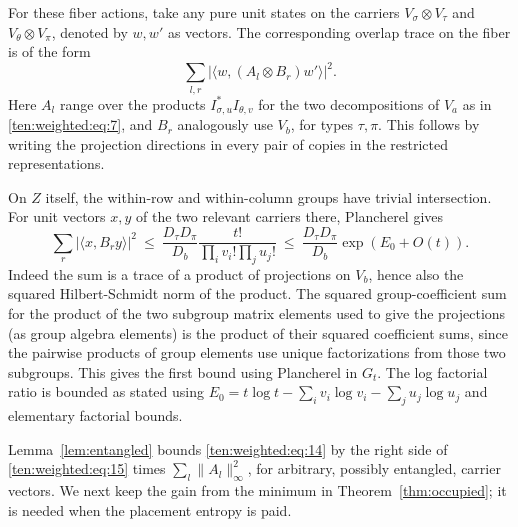 For these fiber actions, take any pure unit states on the carriers \(V_\sigma\otimes V_\tau\) and \(V_\theta\otimes V_\pi\), denoted by \(w,w'\) as vectors. The corresponding overlap trace on the fiber is of the form
\begin{equation}
 \sum_{l,r} |\langle w,(A_l\otimes B_r) w'\rangle|^2.                                      \label{ten:weighted:eq:14}
\end{equation}
Here \(A_l\) range over the products \(I_{\sigma,u}^* I_{\theta,v}\) for the two decompositions of \(V_a\) as in \eqref{ten:weighted:eq:7}, and \(B_r\) analogously use \(V_b\), for types \(\tau,\pi\). This follows by writing the projection directions in every pair of copies in the restricted representations.

On \(Z\) itself, the within-row and within-column groups have trivial intersection. For unit vectors \(x,y\) of the two relevant carriers there, Plancherel gives
\begin{equation}
 \sum_r |\langle x,B_r y\rangle|^2
 \ \le\ \frac{D_\tau D_\pi}{D_b}\frac{t!}{\prod_i v_i!\prod_j u_j!}
 \ \le\ \frac{D_\tau D_\pi}{D_b}\exp(E_0+O(t)).                                             \label{ten:weighted:eq:15}
\end{equation}
Indeed the sum is a trace of a product of projections on \(V_b\), hence also the squared Hilbert-Schmidt norm of the product. The squared group-coefficient sum for the product of the two subgroup matrix elements used to give the projections (as group algebra elements) is the product of their squared coefficient sums, since the pairwise products of group elements use unique factorizations from those two subgroups. This gives the first bound using Plancherel in \(G_t\). The log factorial ratio is bounded as stated using \(E_0=t\log t-\sum_i v_i\log v_i-\sum_j u_j\log u_j\) and elementary factorial bounds.

Lemma~\ref{lem:entangled} bounds \eqref{ten:weighted:eq:14} by the right side of \eqref{ten:weighted:eq:15} times \(\sum_l\|A_l\|_\infty^2\), for arbitrary, possibly entangled, carrier vectors. We next keep the gain from the minimum in Theorem~\ref{thm:occupied}; it is needed when the placement entropy is paid.

